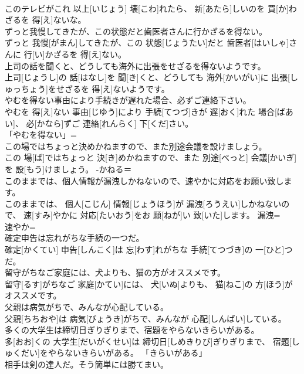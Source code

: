 \documentclass[8pt]{extreport}
\begin{document}
\begin{CJK}{UTF8}{min}
\\	このテレビがこれ 以上[いじょう] 壊[こわ]れたら、 新[あたら]しいのを 買[か]わざるを 得[え]ないな。	
\\	ずっと我慢してきたが、この状態だと歯医者さんに行かざるを得ない。	
\\	ずっと 我慢[がまん]してきたが、この 状態[じょうたい]だと 歯医者[はいしゃ]さんに 行[い]かざるを 得[え]ない。	
\\	上司の話を聞くと、どうしても海外に出張をせざるを得ないようです。	
\\	上司[じょうし]の 話[はなし]を 聞[き]くと、どうしても 海外[かいがい]に 出張[しゅっちょう]をせざるを 得[え]ないようです。	
\\	やむを得ない事由により手続きが遅れた場合、必ずご連絡下さい。	
\\	やむを 得[え]ない 事由[じゆう]により 手続[てつづ]きが 遅[おく]れた 場合[ばあい]、 必[かなら]ずご 連絡[れんらく] 下[くだ]さい。	
\\	「やむを得ない」= 
\\	この場ではちょっと決めかねますので、また別途会議を設けましょう。	
\\	この 場[ば]ではちょっと 決[き]めかねますので、また 別途[べっと] 会議[かいぎ]を 設[もう]けましょう。	-かねる＝ 
\\	このままでは、個人情報が漏洩しかねないので、速やかに対応をお願い致します。	
\\	このままでは、 個人[こじん] 情報[じょうほう]が 漏洩[ろうえい]しかねないので、 速[すみ]やかに 対応[たいおう]をお 願[ねが]い 致[いた]します。	漏洩= 
\\	速やか= 
\\	確定申告は忘れがちな手続の一つだ。	
\\	確定[かくてい] 申告[しんこく]は 忘[わす]れがちな 手続[てつづき]の 一[ひと]つだ。	
\\	留守がちなご家庭には、犬よりも、猫の方がオススメです。	
\\	留守[るす]がちなご 家庭[かてい]には、 犬[いぬ]よりも、 猫[ねこ]の 方[ほう]がオススメです。	
\\	父親は病気がちで、みんなが心配している。	
\\	父親[ちちおや]は 病気[びょうき]がちで、みんなが 心配[しんぱい]している。	
\\	多くの大学生は締切日ぎりぎりまで、宿題をやらないきらいがある。	
\\	多[おお]くの 大学生[だいがくせい]は 締切日[しめきりび]ぎりぎりまで、 宿題[しゅくだい]をやらないきらいがある。	「きらいがある」
\\	相手は剣の達人だ。そう簡単には勝てまい。	

\end{CJK}
\end{document}
